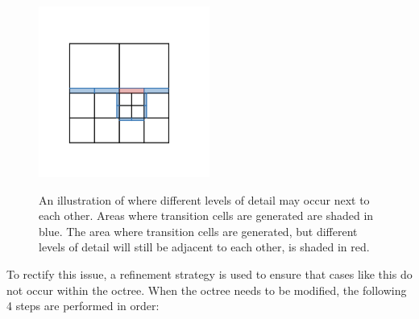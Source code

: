 \documentclass[11pt]{article}
\begin{document}
\begin{figure}
  \caption{An illustration of where different levels of detail may occur next to each other. Areas where transition cells are generated are shaded in blue. The area where transition cells are generated, but different levels of detail will still be adjacent to each other, is shaded in red.}
  \includegraphics[width=0.5\textwidth]{octree_neighbor_error.png}
  \label{fig:octree_neighbor_error}
\end{figure}
To rectify this issue, a refinement strategy is used to ensure that cases like this do not occur within the octree. When the octree needs to be modified, the following 4 steps are performed in order:
\end{document}

